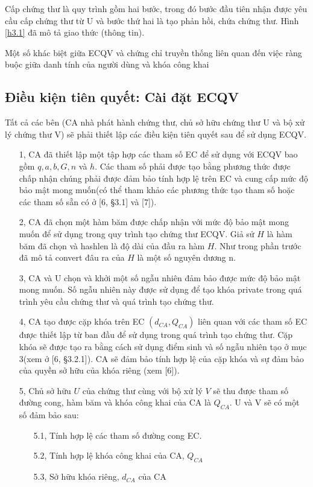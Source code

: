 \documentclass[a4paper,12pt]{report}
\begin{document}
Cấp chứng thư là quy trình gồm hai bước, trong đó bước đầu tiên nhận được yêu cầu cấp chứng thư từ U và bước thứ hai là tạo phản hồi, chứa chứng thư. Hình \ref{h3.1} đã mô tả giao thức (thông tin).

Một số khác biệt giữa ECQV và chứng chỉ truyền thống liên quan đến việc ràng buộc giữa danh tính của người dùng và khóa công khai

\subsection{Điều kiện tiên quyết: Cài đặt ECQV}
Tất cả các bên (CA nhà phát hành chứng thư, chủ sở hữu chứng thư U và bộ xử lý chứng thư V) sẽ phải thiết lập các điều kiện tiên quyết sau để sử dụng ECQV.
\begin{itemize}
\item[1, ] CA đã thiết lập một tập hợp các tham số EC để sử dụng với ECQV bao gồm $q, a, b, G, n$ và $h$. Các tham số phải được tạo bằng phương thức được chấp nhận chúng phải được đảm bảo tính hợp lệ trên EC và cung cấp mức độ bảo mật mong muốn(có thể tham khảo các phương thức tạo tham số hoặc các tham số sẵn có ở [6, §3.1] và [7]).
\item[2, ] CA đã chọn một hàm băm được chấp nhận với mức độ bảo mật mong muốn để sử dụng trong quy trình tạo chứng thư ECQV. Giả sử $H$ là hàm băm đã chọn và hashlen là độ dài của đầu ra hàm $H$. Như trong phần trước đã mô tả convert đâu ra của $H$ là một số nguyên dương n.
\item[3, ] CA và U chọn và khởi một số ngẫu nhiên đảm bảo được mức độ bảo mật mong muốn. Số ngẫu nhiên này được sử dụng để tạo khóa private trong quá trình yêu cầu chứng thư và quá trình tạo chứng thư.
\item[4, ] CA tạo được cặp khóa trên EC $(d_{CA}, Q_{CA})$ liên quan với các tham số EC được thiết lập từ ban đầu để sử dụng trong quá trình tạo chứng thư. Cặp khóa sẽ được tạo ra bằng cách sử dụng điểm  sinh và số ngẫu nhiên tạo ở mục 3(xem ở [6, §3.2.1]). CA sẽ đảm bảo tính hợp lệ của cặp khóa và sự đảm bảo của quyền sở hữu của khóa riêng (xem [6]).
\item[5, ] Chủ sở hữu $U$ của chứng thư cùng với bộ xử lý $V$ sẽ thu được tham số đường cong, hàm băm và khóa công khai của CA là $Q_{CA}$. U và V sẽ có một số đảm bảo sau:
\begin{itemize}
\item[5.1, ] Tính hợp lệ các tham số đường cong EC.
\item[5.2, ] Tính hợp lệ khóa công khai của CA, $Q_{CA}$
\item[5.3, ] Sở hữu khóa riêng, $d_{CA}$ của CA
\end{itemize}
\end{itemize}
\end{document}
